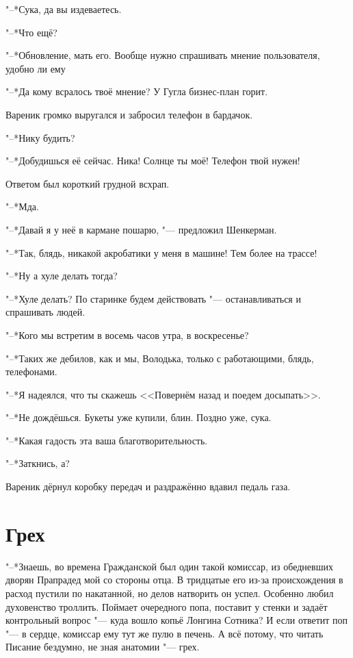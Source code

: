 "--*Сука, да вы издеваетесь.

"--*Что ещё?

"--*Обновление, мать его.
Вообще нужно спрашивать мнение пользователя, удобно ли ему\ldotst

"--*Да кому всралось твоё мнение?
У Гугла бизнес-план горит.

Вареник громко выругался и забросил телефон в бардачок.

"--*Нику будить?

"--*Добудишься её сейчас.
Ника!
Солнце ты моё!
Телефон твой нужен!

Ответом был короткий грудной всхрап.

"--*Мда.

"--*Давай я у неё в кармане пошарю, "--- предложил Шенкерман.

"--*Так, блядь, никакой акробатики у меня в машине!
Тем более на трассе!

"--*Ну а хуле делать тогда?

"--*Хуле делать?
По старинке будем действовать "--- останавливаться и спрашивать людей.

"--*Кого мы встретим в восемь часов утра, в воскресенье?

"--*Таких же дебилов, как и мы, Володька, только с работающими, блядь, телефонами.

"--*Я надеялся, что ты скажешь <<Повернём назад и поедем досыпать>>.

"--*Не дождёшься.
Букеты уже купили, блин.
Поздно уже, сука.

"--*Какая гадость эта ваша благотворительность.

"--*Заткнись, а?

Вареник дёрнул коробку передач и раздражённо вдавил педаль газа.

\section{Грех}

"--*Знаешь, во времена Гражданской был один такой комиссар, из обедневших дворян\ldotst
Прапрадед мой со стороны отца.
В тридцатые его из-за происхождения в расход пустили по накатанной, но делов натворить он успел.
Особенно любил духовенство троллить.
Поймает очередного попа, поставит у стенки и задаёт контрольный вопрос "--- куда вошло копьё Лонгина Сотника?
И если ответит поп "--- в сердце, комиссар ему тут же пулю в печень.
А всё потому, что читать Писание бездумно, не зная анатомии "--- грех.

